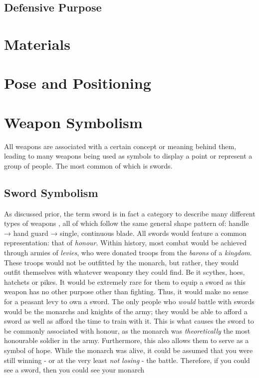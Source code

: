 \documentclass{article}
\begin{document}
\subsection{Defensive Purpose}

\pagebreak

\section{Materials}

\pagebreak
\section{Pose and Positioning}



\pagebreak

\section{Weapon Symbolism}
All weapons are associated with a certain concept or meaning behind them, leading to many weapons being used as symbols to display a point or represent a group of people. The most common of which is swords.
\subsection{Sword Symbolism} \label{swordSymbol}
As discussed prior, the term sword is in fact a category to describe many different types of weapons \parencite{furat1998brief}, all of which follow the same general shape pattern of: handle → hand guard → single, continuous blade.
All swords would feature a common representation: that of \emph{honour}. Within history, most combat would be achieved through armies of \emph{levies}, who were donated troops from the \emph{barons} of a \emph{kingdom}. These troops would not be outfitted by the monarch, but rather, they would outfit themselves with whatever weaponry they could find. Be it scythes, hoes, hatchets or pikes. It would be extremely rare for them to equip a sword as this weapon has no other purpose other than fighting. Thus, it would make no sense for a peasant levy to own a sword. The only people who \emph{would} battle with swords would be the monarchs and knights of the army; they would be able to afford a sword as well as afford the time to train with it. This is what causes the sword to be commonly associated with honour, as the monarch was \textit{theoretically} the most honourable soldier in the army. Furthermore, this also allows them to serve as a symbol of hope. While the monarch was alive, it could be assumed that you were still winning - or at the very least \emph{not losing} - the battle. Therefore, if you could see a sword, then you could see your monarch
\end{document}
